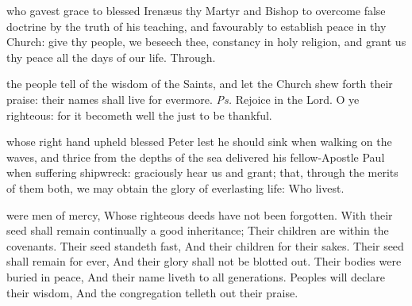 \vspace{-0.1\baselineskip}

 who gavest grace to blessed Iren{\ae}us thy Martyr and Bishop to overcome false doctrine by the truth of his teaching, and favourably to establish peace in thy Church: give thy people, we beseech thee, constancy in holy religion, and grant us thy peace all the days of our life. Through.



\vspace{-0.15\baselineskip}

\introit

\vspace{-0.1\baselineskip}

 the people tell of the wisdom of the Saints, and let the Church shew forth their praise: their names shall live for evermore. \textit{Ps.} Rejoice in the Lord. O ye righteous: for it becometh well the just to be thankful.

\vspace{-0.15\baselineskip}

\collect

\vspace{-0.1\baselineskip}

 whose right hand upheld blessed Peter lest he should sink when walking on the waves, and thrice from the depths of the sea delivered his fellow-Apostle Paul when suffering shipwreck: graciously hear us and grant; that, through the merits of them both, we may obtain the glory of everlasting life: Who livest.

\vspace{-0.15\baselineskip}


\vspace{-0.1\baselineskip}

 were men of mercy, Whose righteous deeds have not been forgotten. With their seed shall remain continually a good inheritance; Their children are within the covenants. Their seed standeth fast, And their children for their sakes. Their seed shall remain for ever, And their glory shall not be blotted out. Their bodies were buried in peace, And their name liveth to all generations. Peoples will declare their wisdom, And the congregation telleth out their praise. 

